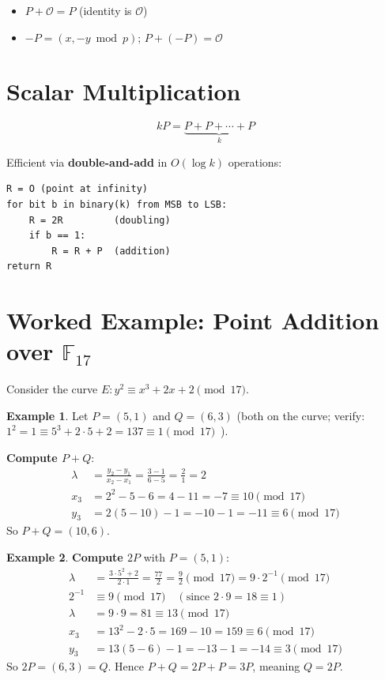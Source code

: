 \documentclass[12pt,a4paper,openany]{book}
\theoremstyle{definition}
\newtheorem{example}{Example}[chapter]
\theoremstyle{plain}
\theoremstyle{remark}
\begin{document}
\begin{itemize}
  \item $P+\mathcal{O}=P$ \quad (identity is $\mathcal{O}$)
  \item $-P=(x,-y\bmod p)$; \quad $P+(-P)=\mathcal{O}$
\end{itemize}

\section{Scalar Multiplication}

\[
  kP = \underbrace{P+P+\cdots+P}_{k}
\]

Efficient via \textbf{double-and-add} in $O(\log k)$ operations:

\begin{lstlisting}[language={}]
R = O (point at infinity)
for bit b in binary(k) from MSB to LSB:
    R = 2R         (doubling)
    if b == 1:
        R = R + P  (addition)
return R
\end{lstlisting}

\section{Worked Example: Point Addition over $\mathbb{F}_{17}$}

Consider the curve $E: y^2\equiv x^3+2x+2\pmod{17}$.

\begin{example}
  Let $P=(5,1)$ and $Q=(6,3)$ (both on the curve; verify:
  $1^2=1\equiv 5^3+2\cdot5+2=137\equiv 1\pmod{17}$~\checkmark).

  \textbf{Compute $P+Q$}:
  \begin{align*}
    \lambda &= \frac{y_2-y_1}{x_2-x_1} = \frac{3-1}{6-5} = \frac{2}{1} = 2 \\
    x_3 &= 2^2 - 5 - 6 = 4-11 = -7\equiv 10\pmod{17} \\
    y_3 &= 2(5-10)-1 = -10-1 = -11\equiv 6\pmod{17}
  \end{align*}
  So $P+Q = (10,6)$.
\end{example}

\begin{example}
  \textbf{Compute $2P$} with $P=(5,1)$:
  \begin{align*}
    \lambda &= \frac{3\cdot5^2+2}{2\cdot1} = \frac{77}{2}
             = \frac{9}{2}\pmod{17}
             = 9\cdot 2^{-1}\pmod{17} \\
    2^{-1}&\equiv 9\pmod{17} \quad(\text{since }2\cdot 9=18\equiv 1) \\
    \lambda &= 9\cdot 9 = 81\equiv 13\pmod{17} \\
    x_3 &= 13^2 - 2\cdot5 = 169-10 = 159\equiv 6\pmod{17} \\
    y_3 &= 13(5-6)-1 = -13-1=-14\equiv 3\pmod{17}
  \end{align*}
  So $2P=(6,3)=Q$.  Hence $P+Q = 2P+P=3P$, meaning $Q=2P$.
\end{example}
\end{document}
